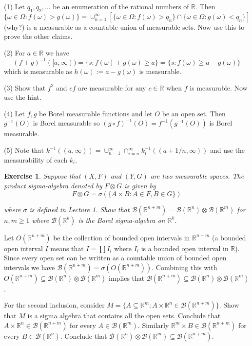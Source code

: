 \documentclass[letter,11pt]{article}
\newtheorem{exercise}{Exercise}[section]
\begin{document}
(1) Let $q_{1},q_{2},\ldots$ be an enumeration of the rational numbers of $\mathbb{R}$. Then 
$$ \{\omega \in \Omega: f(\omega) > g(\omega) \} = \cup _{n=1}^{\infty} \left [ \{ \omega \in \Omega: f(\omega) > q_{n} \} \cap \{ \omega \in \Omega: g(\omega) < q_{n} \}  \right ]$$ 
(why?) is a measurable as a countable union of measurable sets. Now use this to prove the other claims.

(2) For $a \in \mathbb {R}$ we have 
$$ (f+g)^{-1}([a,\infty)) = \{s: f(\omega) +g(\omega) \geq a \} = \{s: f(\omega) \geq a -g(\omega) \} $$
which is measurable as $h(\omega) := a-g(\omega)$ is measurable. 


(3) Show that $f^{2}$ and $cf$ are measurable for any $c \in \mathbb{R}$ when $f$ is measurable. Now use the hint. 

(4) Let $f,g$ be Borel measurable functions and let $O$ be an open set.  Then $g^{-1}(O)$ is Borel measurable so $(g \circ f)^{-1} (O ) = f^{-1} (g^{-1}(O))$ is Borel measurable.  


(5) Note that $k^{-1}((a,\infty)) = \cup _{n=1}^{\infty} \cap _{i=n}^{\infty} k_{i}^{-1} ((a+1/n,\infty))$ and use the measurability of each $k_{i}$. 


\begin{exercise}
    Suppose that $(X,F)$ and $(Y,G)$ are two measurable spaces. The product sigma-algebra denoted by $F \otimes G$ is given by 
    $$ F \otimes G = \sigma  ( \{ A \times B: A \in F, B \in G \} ) $$

where $\sigma$ is defined in Lecture 1. 
    Show that $\mathcal{B} (\mathbb{R}^{n+m}) =\mathcal{B} (\mathbb{R}^{n}) \otimes 
 \mathcal{B} (\mathbb{R}^{m})   $ for $n , m \geq 1$ 
where   $\mathcal{B} (\mathbb{R}^{k})$ is the Borel sigma-algebra on $\mathbb{R}^{k}$. 
\end{exercise}

Let $O(\mathbb{R}^{n+m})$ be the collection of  bounded open intervals in $\mathbb{R}^{n+m}$ (a bounded open interval $I$ means that $I= \prod I_{i}$ where $I_{i}$ is a bounded open interval in $\mathbb{R}$).  Since every open set can be written as a countable union of  bounded open intervals we have  $\mathcal{B} (\mathbb{R}^{n+m}) = \sigma (O(\mathbb{R}^{n+m}))$. Combining this with $O(\mathbb{R}^{n+m}) \subseteq \mathcal{B} (\mathbb{R}^{n}) \otimes 
 \mathcal{B} (\mathbb{R}^{m})  $ implies that $\mathcal{B} (\mathbb{R}^{n+m})  \subseteq \mathcal{B} (\mathbb{R}^{n}) \otimes 
 \mathcal{B} (\mathbb{R}^{m})  $.

 For the second inclusion, consider $M = \{ A \subseteq \mathbb {R}^{m} : A \times \mathbb {R}^{n} \in \mathcal{B} (\mathbb{R}^{n+m}) \}$. Show that $M$ is a sigma algebra that contains all the open sets.  Conclude that $ A \times \mathbb {R}^{n} \in \mathcal{B} (\mathbb{R}^{n+m})$ for every $A \in \mathcal{B} (\mathbb{R}^{m})$. Similarly $ \mathbb {R}^{m} \times B \in \mathcal{B} (\mathbb{R}^{n+m})$ for every $B \in \mathcal{B} (\mathbb{R}^{n})$. Conclude that $ \mathcal{B} (\mathbb{R}^{n}) \otimes 
 \mathcal{B} (\mathbb{R}^{m})  \subseteq  \mathcal{B} (\mathbb{R}^{n+m}) $.
\end{document}

